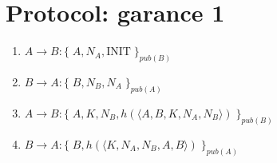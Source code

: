 \section{Protocol: garance 1}

\begin{enumerate}
    \item $A \rightarrow B : \{\;A, N_A, \text{INIT}\;\}_{pub(B)}$
    \item $B \rightarrow A : \{\;B, N_B, N_A\;\}_{pub(A)}$
    \item $A \rightarrow B : \{\;A, K, N_B, h(\langle A, B, K, N_A, N_B\rangle)\;\}_{pub(B)}$
    \item $B \rightarrow A : \{\;B, h(\langle K, N_A, N_B, A, B\rangle)\;\}_{pub(A)}$
\end{enumerate}